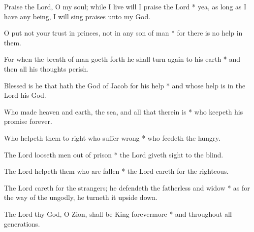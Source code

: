 Praise the Lord, O my soul; while I live will I praise the Lord * yea, as long as I have any being, I will sing praises unto my God.

O put not your trust in princes, not in any son of man * for there is no help in them.
	
For when the breath of man goeth forth he shall turn again to his earth * and then all his thoughts perish.
	
Blessed is he that hath the God of Jacob for his help * and whose help is in the Lord his God.
	
Who made heaven and earth, the sea, and all that therein is * who keepeth his promise forever.
	
Who helpeth them to right who suffer wrong * who feedeth the hungry.
	
The Lord looseth men out of prison * the Lord giveth sight to the blind.
	
The Lord helpeth them who are fallen * the Lord careth for the righteous.
	
The Lord careth for the strangers; he defendeth the fatherless and widow * as for the way of the ungodly, he turneth it upside down.
	
The Lord thy God, O Zion, shall be King forevermore * and throughout all generations.